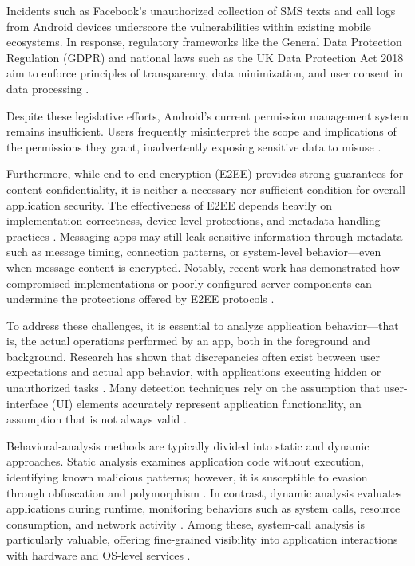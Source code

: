 \documentclass[a4paper,12pt]{report}
\begin{document}
Incidents such as Facebook’s unauthorized collection of SMS texts and call logs
from Android devices \cite{ArsTechnica2018} underscore the vulnerabilities within
existing mobile ecosystems. In response, regulatory frameworks like the General
Data Protection Regulation (GDPR) and national laws such as the UK Data
Protection Act 2018 aim to enforce principles of transparency, data minimization,
and user consent in data processing \cite{GDPR2016,UKDPA2018}.

Despite these legislative efforts, Android’s current permission management system
remains insufficient. Users frequently misinterpret the scope and implications of
the permissions they grant, inadvertently exposing sensitive data to misuse
\cite{CHI2024Permissions}.

Furthermore, while end-to-end encryption (E2EE) provides strong guarantees for content confidentiality, it is neither a necessary nor sufficient condition for overall application security. The effectiveness of E2EE depends heavily on implementation correctness, device-level protections, and metadata handling practices \cite{arxiv2020metadata, wired2023signalhack}. Messaging apps may still leak sensitive information through metadata such as message timing, connection patterns, or system-level behavior—even when message content is encrypted. Notably, recent work has demonstrated how compromised implementations or poorly configured server components can undermine the protections offered by E2EE protocols \cite{wired2023signalhack}.

To address these challenges, it is essential to analyze application behavior—that
is, the actual operations performed by an app, both in the foreground and
background. Research has shown that discrepancies often exist between user
expectations and actual app behavior, with applications executing hidden or
unauthorized tasks \cite{NDSS2025Mismatch}. Many detection techniques rely on the
assumption that user-interface (UI) elements accurately represent application
functionality, an assumption that is not always valid \cite{NDSS2025Mismatch}.

Behavioral-analysis methods are typically divided into static and dynamic
approaches. Static analysis examines application code without execution,
identifying known malicious patterns; however, it is susceptible to evasion
through obfuscation and polymorphism \cite{MDPI2023Obfuscation}. In contrast,
dynamic analysis evaluates applications during runtime, monitoring behaviors such
as system calls, resource consumption, and network activity
\cite{SciDirect2023Syscall}. Among these, system-call analysis is particularly
valuable, offering fine-grained visibility into application interactions with
hardware and OS-level services \cite{SciDirect2023Syscall}.
\end{document}
